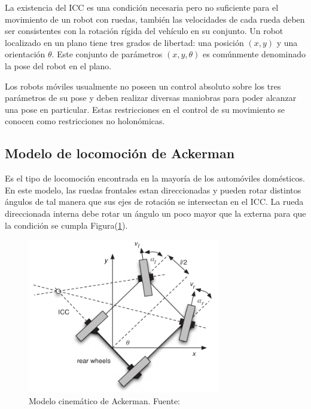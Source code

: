 La existencia del ICC es una condición necesaria pero no suficiente para el movimiento de un robot con ruedas, también las 
velocidades de cada rueda deben ser consistentes con la rotación rígida del vehículo en su conjunto. Un robot localizado en 
un plano tiene tres grados de libertad: una posición $(x,y)$ y una orientación $\theta$. Este conjunto de parámetros $(x,y,\theta)$ 
es comúnmente denominado la pose del robot en el plano.

Los robots móviles usualmente no poseen un control absoluto sobre los tres parámetros de su pose y deben realizar diversas 
maniobras para poder alcanzar una pose en particular. Estas restricciones en el control de su movimiento se conocen como 
restricciones no holonómicas. 

    \subsection{Modelo de locomoción de Ackerman}
    Es el tipo de locomoción encontrada en la mayoría de los automóviles domésticos. En este modelo, las ruedas frontales estan 
    direccionadas y pueden rotar distintos ángulos de tal manera que sus ejes de rotación se intersectan en el ICC. La rueda 
    direccionada interna debe rotar un ángulo un poco mayor que la externa para que la condición se cumpla Figura(\ref{fig:ackerman}).


    \begin{figure}[!h] 
        \centering
        \includegraphics[width=0.75\textwidth]{img/ackerman}
        \caption[Modelo cinemático de Ackerman]{Modelo cinemático de Ackerman. Fuente: \cite{GregoryMcGillUniversity2010} }
        \label{fig:ackerman}
    \end{figure}

